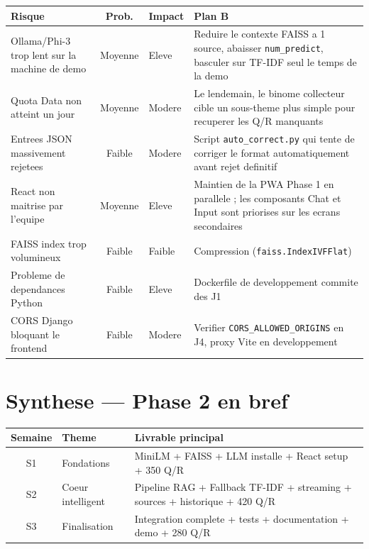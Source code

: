 \documentclass[11pt,a4paper]{article}
\begin{document}
\begin{center}
\begin{tabular}{p{4.5cm} c p{2cm} p{5cm}}
\toprule
\textbf{Risque} & \textbf{Prob.} & \textbf{Impact} & \textbf{Plan B} \\
\midrule
Ollama/Phi-3 trop lent sur la machine de demo & Moyenne & Eleve & Reduire le contexte FAISS a 1 source, abaisser \texttt{num\_predict}, basculer sur TF-IDF seul le temps de la demo \\
\midrule
Quota Data non atteint un jour & Moyenne & Modere & Le lendemain, le binome collecteur cible un sous-theme plus simple pour recuperer les Q/R manquants \\
\midrule
Entrees JSON massivement rejetees & Faible & Modere & Script \texttt{auto\_correct.py} qui tente de corriger le format automatiquement avant rejet definitif \\
\midrule
React non maitrise par l'equipe & Moyenne & Eleve & Maintien de la PWA Phase 1 en parallele ; les composants Chat et Input sont priorises sur les ecrans secondaires \\
\midrule
FAISS index trop volumineux & Faible & Faible & Compression (\texttt{faiss.IndexIVFFlat}) \\
\midrule
Probleme de dependances Python & Faible & Eleve & Dockerfile de developpement commite des J1 \\
\midrule
CORS Django bloquant le frontend & Faible & Modere & Verifier \texttt{CORS\_ALLOWED\_ORIGINS} en J4, proxy Vite en developpement \\
\bottomrule
\end{tabular}
\end{center}

\clearpage

\section*{Synthese --- Phase 2 en bref}

\begin{phase2box}
\begin{center}
\begin{tabular}{c l p{7cm}}
\toprule
\textbf{Semaine} & \textbf{Theme} & \textbf{Livrable principal} \\
\midrule
S1 & Fondations & MiniLM + FAISS + LLM installe + React setup + 350 Q/R \\
S2 & Coeur intelligent & Pipeline RAG + Fallback TF-IDF + streaming + sources + historique + 420 Q/R \\
S3 & Finalisation & Integration complete + tests + documentation + demo + 280 Q/R \\
\bottomrule
\end{tabular}
\end{center}
\end{phase2box}
\end{document}
